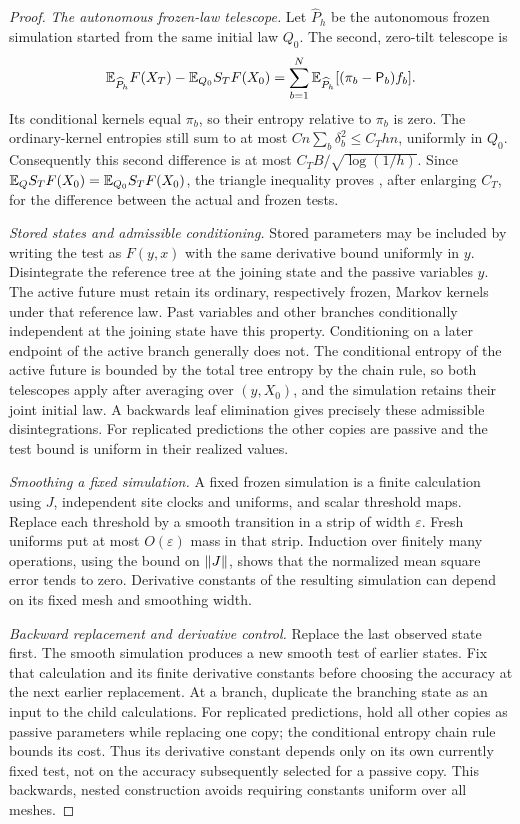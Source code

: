 \begin{proof}
\emph{The autonomous frozen-law telescope.}
Let $\widehat P_h$ be the autonomous frozen simulation started from
the same initial law $Q_0$.  The second, zero-tilt telescope is
\begin{equation}
 \mathbb E_{\widehat P_h}F(X_T)-\mathbb E_{Q_0}S_TF(X_0)
 =\sum_{b=1}^N\mathbb E_{\widehat P_h}
                         [(\pi_b-\mathsf P_b)f_b].
 \label{eq:path-frozen-telescope}
\end{equation}
Its conditional kernels equal $\pi_b$, so their entropy relative
to $\pi_b$ is zero.  The ordinary-kernel entropies still sum to at
most $Cn\sum_b\delta_b^2\le C_Thn$, uniformly in $Q_0$.
Consequently this second difference is at most
$C_TB/\sqrt{\log(1/h)}$.
Since $\mathbb E_QS_TF(X_0)=\mathbb E_{Q_0}S_TF(X_0)$, the triangle
inequality proves , after enlarging
$C_T$, for the difference between the actual and frozen tests.

\emph{Stored states and admissible conditioning.}
Stored parameters may be included by writing the test as $F(y,x)$
with the same derivative bound uniformly in $y$.
Disintegrate the reference tree at the joining state and the passive
variables $y$.  The active future must retain its ordinary,
respectively frozen, Markov kernels under that reference law.
Past variables and other branches conditionally independent at the
joining state have this property.  Conditioning on a later endpoint
of the active branch generally does not.  The conditional entropy
of the active future is bounded by the total tree entropy by the
chain rule, so both telescopes apply after averaging over $(y,X_0)$,
and the simulation retains their joint initial law.
A backwards leaf elimination gives precisely these admissible
disintegrations.  For replicated predictions the other copies are
passive and the test bound is uniform in their realized values.

\emph{Smoothing a fixed simulation.}
A fixed frozen simulation is a finite calculation using $J$, independent
site clocks and uniforms, and scalar threshold maps.  Replace each
threshold by a smooth transition in a strip of width $\varepsilon$.
Fresh uniforms put at most $O(\varepsilon)$ mass in that strip.
Induction over finitely many operations, using the bound on $\left\lVert J\right\rVert$,
shows that the normalized mean square error tends to zero.  Derivative
constants of the resulting simulation can depend on its fixed mesh and
smoothing width.

\emph{Backward replacement and derivative control.}
Replace the last observed state first.  The smooth simulation produces
a new smooth test of earlier states.  Fix that calculation and its
finite derivative constants before choosing the accuracy at the next
earlier replacement.  At a branch, duplicate the branching state as
an input to the child calculations.  For replicated predictions, hold
all other copies as passive parameters while replacing one copy; the
conditional entropy chain rule bounds its cost.  Thus its derivative
constant depends only on its own currently fixed test, not on the
accuracy subsequently selected for a passive copy.  This backwards,
nested construction avoids requiring constants uniform over all meshes.


\end{proof}
